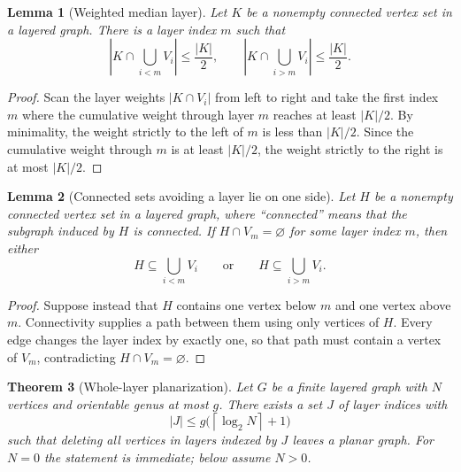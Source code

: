 \documentclass[11pt]{article}
\newtheorem{theorem}{Theorem}[section]
\newtheorem{lemma}[theorem]{Lemma}
\theoremstyle{definition}
\newcommand{\ceil}[1]{\left\lceil #1\right\rceil}
\begin{document}
\begin{lemma}[Weighted median layer]\label{lem:median}
Let $K$ be a nonempty connected vertex set in a layered graph.  There is a
layer index $m$ such that
\[
 \left|K\cap\bigcup_{i<m}V_i\right|\le \frac{|K|}{2},
 \qquad
 \left|K\cap\bigcup_{i>m}V_i\right|\le \frac{|K|}{2}.
\]
\end{lemma}

\begin{proof}
Scan the layer weights $|K\cap V_i|$ from left to right and take the first
index $m$ where the cumulative weight through layer $m$ reaches at least
$|K|/2$.  By minimality, the weight strictly to the left of $m$ is less than
$|K|/2$.  Since the cumulative weight through $m$ is at least $|K|/2$, the
weight strictly to the right is at most $|K|/2$.
\end{proof}

\begin{lemma}[Connected sets avoiding a layer lie on one side]\label{lem:one-side}
Let $H$ be a nonempty connected vertex set in a layered graph, where
``connected'' means that the subgraph induced by $H$ is connected.  If
$H\cap V_m=\varnothing$ for some layer index $m$, then either
\[
  H\subseteq \bigcup_{i<m}V_i
  \qquad\text{or}\qquad
  H\subseteq \bigcup_{i>m}V_i.
\]
\end{lemma}

\begin{proof}
Suppose instead that $H$ contains one vertex below $m$ and one vertex above
$m$.  Connectivity supplies a path between them using only vertices of $H$.
Every edge changes the layer index by exactly one, so that path must contain a
vertex of $V_m$, contradicting $H\cap V_m=\varnothing$.
\end{proof}

\begin{theorem}[Whole-layer planarization]\label{thm:layer-planarization}
Let $G$ be a finite layered graph with $N$ vertices and orientable genus at
most $g$.  There exists a set $J$ of layer indices with
\[
  |J|\le g\bigl(\ceil{\log_2 N}+1\bigr)
\]
such that deleting all vertices in layers indexed by $J$ leaves a planar
graph.  For $N=0$ the statement is immediate; below assume $N>0$.
\end{theorem}
\end{document}
